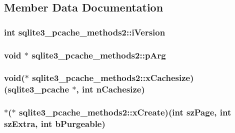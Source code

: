 \subsection{Member Data Documentation}
\hypertarget{structsqlite3__pcache__methods2_a03b27be6c7cb8f1d2662c454cbe58483}{
\subsubsection[{i\-Version}]{\setlength{\rightskip}{0pt plus 5cm}int sqlite3\-\_\-pcache\-\_\-methods2\-::i\-Version}}\label{structsqlite3__pcache__methods2_a03b27be6c7cb8f1d2662c454cbe58483}
\hypertarget{structsqlite3__pcache__methods2_a4bea91c33987eef02122bbf8a49745de}{
\subsubsection[{p\-Arg}]{\setlength{\rightskip}{0pt plus 5cm}void $\ast$ sqlite3\-\_\-pcache\-\_\-methods2\-::p\-Arg}}\label{structsqlite3__pcache__methods2_a4bea91c33987eef02122bbf8a49745de}
\hypertarget{structsqlite3__pcache__methods2_a4889ab0903938f485aa0fa4fc6925d26}{
\subsubsection[{x\-Cachesize}]{\setlength{\rightskip}{0pt plus 5cm}void($\ast$ sqlite3\-\_\-pcache\-\_\-methods2\-::x\-Cachesize)({\bf sqlite3\-\_\-pcache} $\ast$, int n\-Cachesize)}}\label{structsqlite3__pcache__methods2_a4889ab0903938f485aa0fa4fc6925d26}
\hypertarget{structsqlite3__pcache__methods2_a91e7752b826e19e7c51c1fa0ce530f0f}{
\subsubsection[{x\-Create}]{ $\ast$($\ast$ sqlite3\-\_\-pcache\-\_\-methods2\-::x\-Create)(int sz\-Page, int sz\-Extra, int b\-Purgeable)}}\label{structsqlite3__pcache__methods2_a91e7752b826e19e7c51c1fa0ce530f0f}
